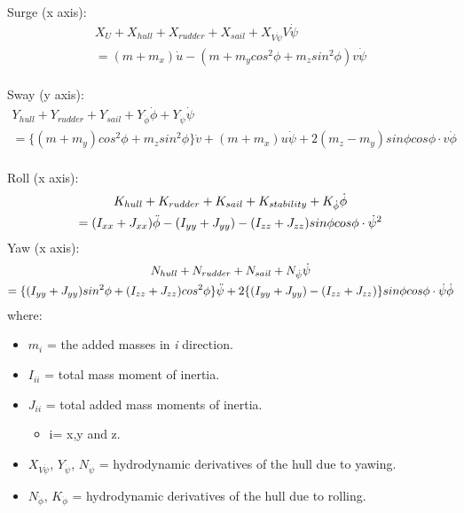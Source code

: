 Surge  (x axis):
\begin{multline}\label{eq:force_xMasuyama}
    X_{U}+X_{hull}+X_{rudder}+X_{sail}+X_{V\Dot{\psi}}V\Dot{\psi}\\ =(m+m_{x})\Dot{u}-(m+m_{y}cos^2\phi+m_{z}sin^2\phi)v\Dot{\psi}
\end{multline}
\\
Sway  (y axis):
\begin{multline}
\label{eq:force_yMasuyama}
Y_{hull} + Y_{rudder} + Y_{sail} + Y_{\Dot{\phi}} \Dot{\phi} + Y_{\Dot{\psi}} \Dot{\psi} \\ 
=\{(m + m_{y})cos^2 \phi + m_{z} sin^2 \phi \} \Dot{v} + (m + m_{x})u \Dot{\psi} + 2(m_{z} - m_{y}) sin\phi cos\phi \cdot v \Dot{\phi}
\end{multline}
\\
Roll (x axis):
\begin{multline}
     K_{hull} + K_{rudder} + K_{sail} + K_{stability} +K_{\Dot{\phi}} \Dot{\phi} \\
 =(I_{xx} + J_{xx}) \Ddot{\phi} - {(I_{yy} + J_{yy})-(I_{zz} + J_{zz})} sin\phi cos\phi \cdot \Dot{\psi}^2
\end{multline}  \label{eq:m_xMasuyama}
\newline
Yaw (x axis):
\begin{multline}
   N_{hull}+N_{rudder}+N_{sail}+N_{\Dot{\psi}}\Dot{\psi}\\
 = \{ (I_{yy} + J_{yy}) sin^2 \phi +(I_{zz} + J_{zz})cos^2 \phi \} \Ddot{\psi} +2 \{(I_{yy} + J_{yy})-(I_{zz} + J_{zz})\}sin\phi cos\phi \cdot \Dot{\psi} \Dot{\phi}  
\end{multline}\label{eq:m_yMasuyama}
\newline
where: 
\begin{itemize}  \label{symbols_motions2}
 \setlength \itemsep{0em}
\item $m_{i}$ = the added masses in \textit{i} direction.
\item $I_{ii}$ = total mass moment of inertia.
\item $J_{ii}$ = total added mass moments of inertia.
\begin{itemize}
    \item i= x,y and z.
\end{itemize} 
\item $X_{V\Dot{\psi}}$, $Y_{\Dot{\psi}}$, $N_{\Dot{\psi}}$  = hydrodynamic derivatives of the hull due to yawing.
\item $N_{\Dot{\phi}}$, $K_{\Dot{\phi}}$  = hydrodynamic derivatives of the hull due to rolling.
\end{itemize}

